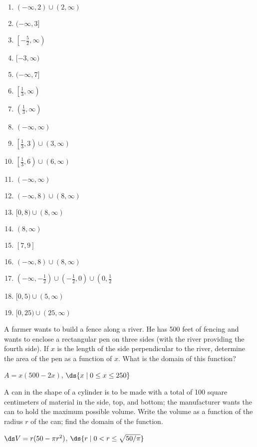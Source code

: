 \begin{enumialphparenastyle}
\begin{multicols}{2}
\begin{ex}
\begin{sol}
\begin{multicols}{2}
\begin{enumerate}
		\item $(-\infty, 2) \cup (2, \infty)$
		\item  $(-\infty, 3]$
		\item $\left[-\frac{5}{2}, \infty \right)$  
		\item  $[-3, \infty)$
		\item $(-\infty, 7]$  
		\item    $\left[ \frac{1}{3}, \infty \right)$
		\item   $\left( \frac{1}{3}, \infty \right)$	
		\item   $(-\infty, \infty)$	
		\item   $\left[ \frac{1}{3}, 3 \right) \cup (3, \infty)$
		\item  $\left[ \frac{1}{3}, 6 \right) \cup (6, \infty)$
		\item   $(-\infty, \infty)$
		\item $(-\infty, 8) \cup (8, \infty)$
		\item $[0, 8) \cup (8, \infty)$
		\item $(8, \infty)$
		\item $[7, 9]$
		\item $(-\infty, 8) \cup (8, \infty)$
		\item $\left( -\infty, -\frac{1}{2} \right) \cup \left( -\frac{1}{2}, 0 \right) \cup \left(0, \frac{1}{2}$ 
		\item $[0, 5) \cup (5,\infty)$
		\item $[0, 25) \cup (25, \infty)$
\end{enumerate}
\end{multicols}

\end{sol}	
\end{ex}
	
	






\begin{ex}
A farmer wants to build a fence along a river.  He has
500 feet of fencing and wants to enclose a rectangular pen on three
sides (with the river providing the fourth side).  If $x$ is the
length of the side perpendicular to the river, determine the area of
the pen as a function of $x$.  What is the domain of this function?
\begin{sol}
$A=x(500-2x)$, $\ds \{x\mid 0\le x\le 250\}$
\end{sol}
\end{ex}

\begin{ex}
A can in the shape of a cylinder is to be made with a total
of 100 square centimeters of material in the side, top, and bottom;
the manufacturer wants the can to hold the maximum possible
volume. Write the volume as a function of the radius $r$ of the can;
find the domain of the function.
\begin{sol}
$\ds V=r(50-\pi r^2)$, $\ds \{r\mid 0< r\le \sqrt{50/\pi}\}$
\end{sol}
\end{ex}


\end{multicols}
\end{enumialphparenastyle}
